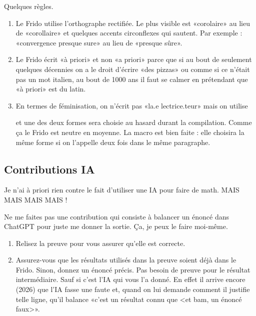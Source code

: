 Quelques règles.
\begin{enumerate}
	\item
	      Le Frido utilise l'orthographe rectifiée. Le plus visible est «corolaire» au lieu de «corollaire» et quelques accents circonflexes qui sautent. Par exemple : «convergence presque sure» au lieu de «presque sûre».
	\item
	      Le Frido écrit «à priori» et non «a priori» parce que si au bout de seulement quelques décennies on a le droit d'écrire «des pizzas» ou comme si ce n'était pas un mot italien, au bout de 1000 ans il faut se calmer en prétendant que «à priori» est du latin.
	\item
	      En termes de féminisation, on n'écrit pas «la.e lectrice.teur» mais on utilise
	      \begin{center}
	      \end{center}
	      et une des deux formes sera choisie au hasard durant la compilation. Comme ça le Frido est neutre en moyenne. La macro est bien faite : elle choisira la même forme si on l'appelle deux fois dans le même paragraphe.
\end{enumerate}


\subsection{Contributions IA}

Je n'ai à priori rien contre le fait d'utiliser une IA pour faire de math. MAIS MAIS MAIS MAIS !

Ne me faites pas une contribution qui consiste à balancer un énoncé dans ChatGPT pour juste me donner la sortie. Ça, je peux le faire moi-même.

\begin{enumerate}
	\item
	      Relisez la preuve pour vous assurer qu'elle est correcte.
	\item
	      Assurez-vous que les résultats utilisés dans la preuve soient déjà dans le Frido. Sinon, donnez un énoncé précis. Pas besoin de preuve pour le résultat intermédiaire. Sauf si c'est l'IA qui vous l'a donné. En effet il arrive encore (2026) que l'IA fasse une faute et, quand on lui demande comment il justifie telle ligne, qu'il balance «c'est un résultat connu que <et bam, un énoncé faux>».
\end{enumerate}

